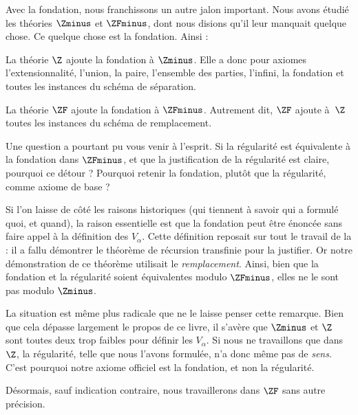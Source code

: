 \documentclass[../../../include/open-logic-section]{subfiles}
\begin{document}

Avec la fondation, nous franchissons un autre jalon important. Nous
avons étudié les théories $\Zminus$ et $\ZFminus$, dont nous disions
qu'il leur manquait quelque chose. Ce quelque chose est la fondation.
Ainsi :

\begin{defn}
La théorie $\Z$ ajoute la fondation à $\Zminus$. Elle a donc pour
axiomes l'extensionnalité, l'union, la paire, l'ensemble des parties,
l'infini, la fondation et toutes les instances du schéma de
séparation.

La théorie $\ZF$ ajoute la fondation à $\ZFminus$. Autrement dit,
$\ZF$ ajoute à~$\Z$ toutes les instances du schéma de remplacement.
\end{defn}

Une question a pourtant pu vous venir à l'esprit. Si la régularité
est équivalente à la fondation dans $\ZFminus$, et que la
justification de la régularité est claire, pourquoi ce détour ?
Pourquoi retenir la fondation, plutôt que la régularité, comme axiome
de base ?

Si l'on laisse de côté les raisons historiques (qui tiennent à savoir
qui a formulé quoi, et quand), la raison essentielle est que la
fondation peut être énoncée sans faire appel à la définition des
$V_\alpha$. Cette définition reposait sur tout le travail de la
 : il a fallu démontrer le théorème de
récursion transfinie pour la justifier. Or notre démonstration de ce
théorème utilisait le \emph{remplacement}. Ainsi, bien que la
fondation et la régularité soient équivalentes modulo $\ZFminus$,
elles ne le sont pas modulo $\Zminus$.

La situation est même plus radicale que ne le laisse penser cette
remarque. Bien que cela dépasse largement le propos de ce livre, il
s'avère que $\Zminus$ et $\Z$ sont toutes deux trop faibles pour
définir les $V_\alpha$. Si nous ne travaillons que dans $\Z$, la
régularité, telle que nous l'avons formulée, n'a donc même pas de
\emph{sens}. C'est pourquoi notre axiome officiel est la fondation,
et non la régularité.

Désormais, sauf indication contraire, nous travaillerons dans $\ZF$
sans autre précision.
\end{document}
